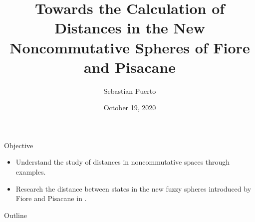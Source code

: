 \documentclass{beamer}
\title[l]{Towards the Calculation of Distances in the New Noncommutative Spheres of Fiore and Pisacane}
\author{Sebastian Puerto}
\institute{Universidad de los Andes\\ Seminario de Física-Matemática}
\date{October 19, 2020}
\theoremstyle{definition}
\theoremstyle{remark}
\begin{document}
\begin{frame}[noframenumbering]
  \titlepage
\end{frame}

\begin{frame}{Objective} %
\begin{itemize}

    \item Understand the study of distances in noncommutative spaces through examples.
    
    \item Research the distance between states in the new fuzzy spheres introduced by Fiore and Pisacane in \cite{Fiore2018}.
    
\end{itemize}

\end{frame}

\begin{frame}[noframenumbering]{Outline}
  \tableofcontents
\end{frame}




%








\printbibliography[title=References]
\end{document}
